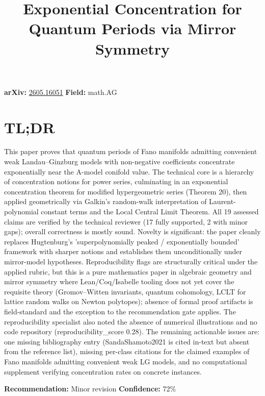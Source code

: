 \documentclass[11pt]{article}
\title{Exponential Concentration for Quantum Periods via Mirror Symmetry}
\date{}
\begin{document}
\maketitle

\noindent\textbf{arXiv:} \href{https://arxiv.org/abs/2605.16051}{2605.16051} \quad \textbf{Field:} math.AG\\

\section*{TL;DR}
This paper proves that quantum periods of Fano manifolds admitting convenient weak Landau–Ginzburg models with non-negative coefficients concentrate exponentially near the A-model conifold value. The technical core is a hierarchy of concentration notions for power series, culminating in an exponential concentration theorem for modified hypergeometric series (Theorem 20), then applied geometrically via Galkin's random-walk interpretation of Laurent-polynomial constant terms and the Local Central Limit Theorem. All 19 assessed claims are verified by the technical reviewer (17 fully supported, 2 with minor gaps); overall correctness is mostly sound. Novelty is significant: the paper cleanly replaces Hugtenburg's 'superpolynomially peaked / exponentially bounded' framework with sharper notions and establishes them unconditionally under mirror-model hypotheses. Reproducibility flags are structurally critical under the applied rubric, but this is a pure mathematics paper in algebraic geometry and mirror symmetry where Lean/Coq/Isabelle tooling does not yet cover the requisite theory (Gromov–Witten invariants, quantum cohomology, LCLT for lattice random walks on Newton polytopes); absence of formal proof artifacts is field-standard and the exception to the recommendation gate applies. The reproducibility specialist also noted the absence of numerical illustrations and no code repository (reproducibility\_score 0.28). The remaining actionable issues are: one missing bibliography entry (SandaShamoto2021 is cited in-text but absent from the reference list), missing per-class citations for the claimed examples of Fano manifolds admitting convenient weak LG models, and no computational supplement verifying concentration rates on concrete instances.

\textbf{Recommendation:} Minor revision \quad \textbf{Confidence:} 72\%\\
\end{document}
